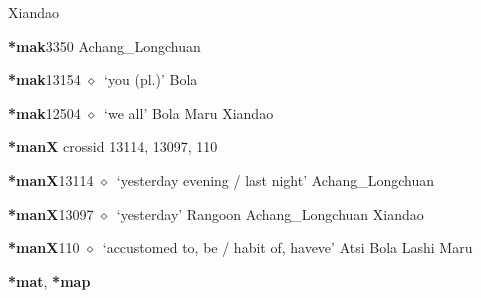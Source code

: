 \begin{list}{}{\leftmargin=1.5em \itemindent=-1.5em}
         Xiandao 
  \item {\footnotesize \textbf{*mak}}{\tiny 3350}
\hspace{1ex}
         Achang\_Longchuan 
  \item {\footnotesize \textbf{*mak}}{\tiny 13154}
\hspace{1ex}
         $\diamond$~`you (pl.)'
         Bola 
  \item {\footnotesize \textbf{*mak}}{\tiny 12504}
\hspace{1ex}
         $\diamond$~`we all'
         Bola 
\hspace{1ex}
         Maru 
\hspace{1ex}
         Xiandao 
  \end{list}
\item
\textbf{*manX}
  {\tiny crossid 13114, 13097, 110}
  \begin{list}{}{\leftmargin=1.5em \itemindent=-1.5em}
  \item {\footnotesize \textbf{*manX}}{\tiny 13114}
         $\diamond$~`yesterday evening / last night'
         Achang\_Longchuan 
  \item {\footnotesize \textbf{*manX}}{\tiny 13097}
\hspace{1ex}
         $\diamond$~`yesterday'
         Rangoon 
\hspace{1ex}
         Achang\_Longchuan 
\hspace{1ex}
         Xiandao 
  \item {\footnotesize \textbf{*manX}}{\tiny 110}
\hspace{1ex}
         $\diamond$~`accustomed to, be / habit of, haveve'
         Atsi 
\hspace{1ex}
         Bola 
\hspace{1ex}
         Lashi 
\hspace{1ex}
         Maru 
  \end{list}
\item
\textbf{*mat}, \textbf{*map}

